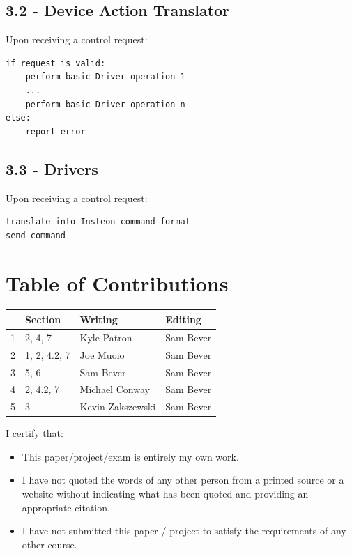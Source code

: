 \documentclass{article}
\begin{document}
\subsection*{3.2 - Device Action Translator}

Upon receiving a control request:

\begin{lstlisting}
if request is valid:
    perform basic Driver operation 1
    ...
    perform basic Driver operation n
else:
    report error
\end{lstlisting}

\subsection*{3.3 - Drivers}

Upon receiving a control request:

\begin{lstlisting}
translate into Insteon command format
send command
\end{lstlisting}

\newpage

\section*{\centering Table of Contributions}
\begin{tabular}{| l | l | l | l |}
    \hline
     & Section & Writing & Editing \\
    \hline \hline
		1 & 2, 4, 7 & Kyle Patron & Sam Bever \\ \hline
		2 & 1, 2, 4.2, 7 & Joe Muoio & Sam Bever \\ \hline
		3 & 5, 6 & Sam Bever &  Sam Bever \\ \hline
		4 & 2, 4.2, 7 & Michael Conway &  Sam Bever \\ \hline
		5 & 3 & Kevin Zakszewski & Sam Bever \\ \hline
\end{tabular}
\newpage
\noindent I certify that:
\begin{itemize}
\item This paper/project/exam is entirely my own work.
\item I have not quoted the words of any other person from a printed source or a website without indicating what has been quoted and providing an appropriate citation.
\item I have not submitted this paper / project to satisfy the requirements of any other course.
\end{itemize}
\end{document}
